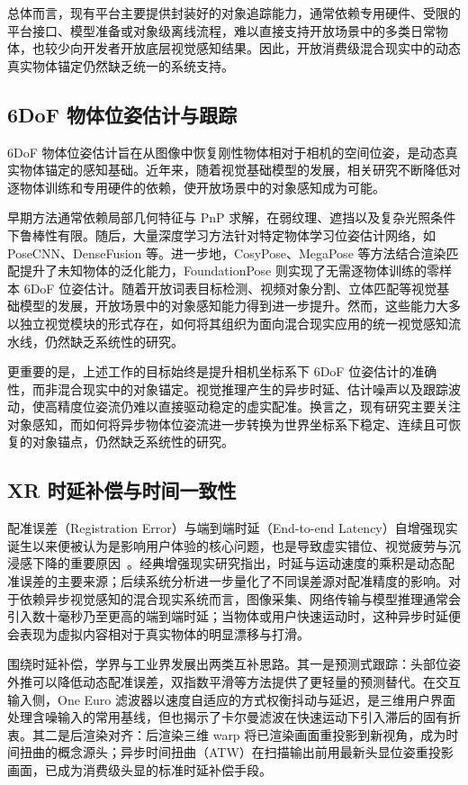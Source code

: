 \documentclass[review]{vgtc}
\begin{document}
总体而言，现有平台主要提供封装好的对象追踪能力，通常依赖专用硬件、受限的平台接口、模型准备或对象级离线流程，难以直接支持开放场景中的多类日常物体，也较少向开发者开放底层视觉感知结果。因此，开放消费级混合现实中的动态真实物体锚定仍然缺乏统一的系统支持。

\subsection{6DoF 物体位姿估计与跟踪}


6DoF 物体位姿估计旨在从图像中恢复刚性物体相对于相机的空间位姿，是动态真实物体锚定的感知基础。近年来，随着视觉基础模型的发展，相关研究不断降低对逐物体训练和专用硬件的依赖，使开放场景中的对象感知成为可能。

早期方法通常依赖局部几何特征与 PnP 求解，在弱纹理、遮挡以及复杂光照条件下鲁棒性有限。随后，大量深度学习方法针对特定物体学习位姿估计网络，如 PoseCNN、DenseFusion 等。进一步地，CosyPose、MegaPose 等方法结合渲染匹配提升了未知物体的泛化能力，FoundationPose 则实现了无需逐物体训练的零样本 6DoF 位姿估计。随着开放词表目标检测、视频对象分割、立体匹配等视觉基础模型的发展，开放场景中的对象感知能力得到进一步提升。然而，这些能力大多以独立视觉模块的形式存在，如何将其组织为面向混合现实应用的统一视觉感知流水线，仍然缺乏系统性的研究。

更重要的是，上述工作的目标始终是提升相机坐标系下 6DoF 位姿估计的准确性，而非混合现实中的对象锚定。视觉推理产生的异步时延、估计噪声以及跟踪波动，使高精度位姿流仍难以直接驱动稳定的虚实配准。换言之，现有研究主要关注对象感知，而如何将异步物体位姿流进一步转换为世界坐标系下稳定、连续且可恢复的对象锚点，仍然缺乏系统性的研究。

\subsection{XR 时延补偿与时间一致性}


配准误差（Registration Error）与端到端时延（End-to-end Latency）自增强现实诞生以来便被认为是影响用户体验的核心问题，也是导致虚实错位、视觉疲劳与沉浸感下降的重要原因~\cite{azuma1994improving,diluca2010latency}。经典增强现实研究指出，时延与运动速度的乘积是动态配准误差的主要来源；后续系统分析进一步量化了不同误差源对配准精度的影响。对于依赖异步视觉感知的混合现实系统而言，图像采集、网络传输与模型推理通常会引入数十毫秒乃至更高的端到端时延；当物体或用户快速运动时，这种异步时延便会表现为虚拟内容相对于真实物体的明显漂移与打滑。

围绕时延补偿，学界与工业界发展出两类互补思路。其一是预测式跟踪：头部位姿外推可以降低动态配准误差，双指数平滑等方法提供了更轻量的预测替代。在交互输入侧，One Euro 滤波器以速度自适应的方式权衡抖动与延迟，是三维用户界面处理含噪输入的常用基线，但也揭示了卡尔曼滤波在快速运动下引入滞后的固有折衷。其二是后渲染对齐：后渲染三维 warp 将已渲染画面重投影到新视角，成为时间扭曲的概念源头；异步时间扭曲（ATW）在扫描输出前用最新头显位姿重投影画面，已成为消费级头显的标准时延补偿手段。
\end{document}
